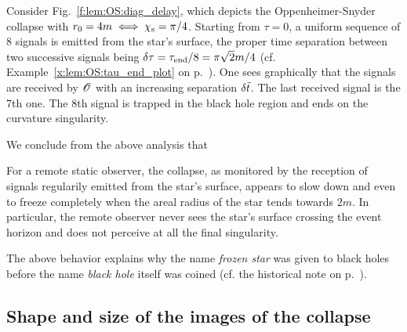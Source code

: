 \begin{example}
Consider Fig.~\ref{f:lem:OS:diag_delay}, which depicts the Oppenheimer-Snyder collapse
with $r_0 = 4 m \iff \chi_{\rm s} = \pi/4$. Starting from $\tau=0$, a uniform sequence of 8 signals is emitted from the star's surface, the proper time separation between two successive signals being
$\delta\tau = \tau_{\rm end}/8 = \pi\sqrt{2} m / 4$ (cf. Example~\ref{x:lem:OS:tau_end_plot} on
p.~\pageref{x:lem:OS:tau_end_plot}). One sees graphically that the signals are received by $\mathscr{O}$
with an increasing separation $\delta{\tilde t}$. The last received signal is the 7th one. The 8th signal is trapped in the black hole region and ends on the curvature singularity.
\end{example}

We conclude from the above analysis that
\begin{greybox}
For a remote static observer, the collapse, as monitored by the reception of signals regularily emitted from the star's surface,
appears to slow down and even to freeze completely when the areal radius
of the star tends towards $2 m$. In particular, the remote observer never sees the
star's surface crossing the event horizon and does not perceive at all the final singularity.
\end{greybox}

\begin{hist}
The above behavior explains why the name \emph{frozen star}
was given to black holes before the name \emph{black hole} itself was coined
(cf. the historical note on p.~\pageref{h:glo:black_hole_name}).
\end{hist}



\subsection{Shape and size of the images of the collapse} \label{s:lem:size_image}


